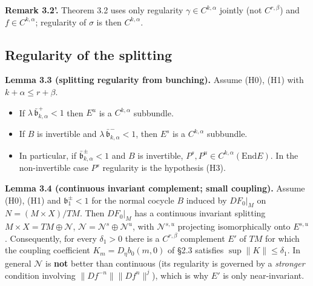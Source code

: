 \documentclass[11pt,a4paper]{article}
\theoremstyle{plain}
\theoremstyle{definition}
\theoremstyle{remark}
\numberwithin{equation}{section}
\numberwithin{figure}{section}
\begin{document}
\textbf{Remark 3.2'.} Theorem 3.2 uses only regularity $\gamma\in C^{k,\alpha}$ jointly (not $C^{r,\beta}$) and $f\in C^{k,\alpha}$; regularity of $\sigma$ is then $C^{k,\alpha}$.

\subsection{Regularity of the splitting}

\textbf{Lemma 3.3 (splitting regularity from bunching).} Assume (H0), (H1) with $k+\alpha\le r+\beta$.
\begin{itemize}
    \item[(a)] If $\lambda\,\bar{\mathfrak b}^+_{k,\alpha}<1$ then $E^u$ is a $C^{k,\alpha}$ subbundle.
    \item[(b)] If $B$ is invertible and $\lambda\,\bar{\mathfrak b}^-_{k,\alpha}<1$, then $E^s$ is a $C^{k,\alpha}$ subbundle.
    \item[(c)] In particular, if $\bar{\mathfrak b}^\pm_{k,\alpha}<1$ and $B$ is invertible, $P^s,P^u\in C^{k,\alpha}(\mathrm{End}E)$. In the non-invertible case $P^s$ regularity is the hypothesis (H3).
\end{itemize}



\textbf{Lemma 3.4 (continuous invariant complement; small coupling).} Assume (H0), (H1) and $\mathfrak b^\pm_1<1$ for the normal cocycle $B$ induced by $DF_0|_M$ on $N=(M\times X)/TM$. Then $DF_0|_M$ has a continuous invariant splitting $M\times X=TM\oplus\mathcal N$, $\mathcal N=\mathcal N^s\oplus\mathcal N^u$, with $\mathcal N^{s,u}$ projecting isomorphically onto $E^{s,u}$. Consequently, for every $\delta_1>0$ there is a $C^{r,\beta}$ complement $E'$ of $TM$ for which the coupling coefficient $K_m=D_\eta b_0(m,0)$ of \S2.3 satisfies $\sup\|K\|\le\delta_1$. In general $\mathcal N$ is \textbf{not} better than continuous (its regularity is governed by a \textit{stronger} condition involving $\|Df^{-n}\|\|Df^n\|^j$), which is why $E'$ is only near-invariant.
\end{document}
